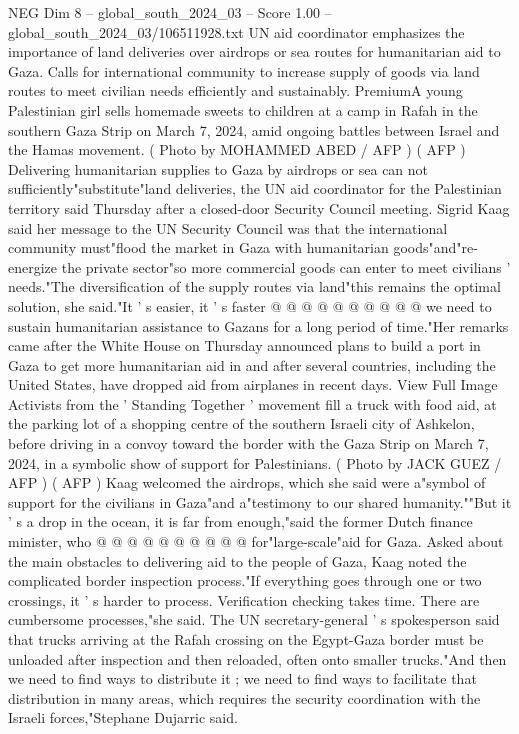 \begin{textsample}{NEG Dim 8 – global\_south\_2024\_03 – Score 1.00 – global\_south\_2024\_03/106511928.txt}  \label{ex:f8_neg_363}
UN aid coordinator emphasizes the importance of land deliveries over airdrops or sea routes for humanitarian aid to Gaza.
Calls for international community to increase supply of goods via land routes to meet civilian needs efficiently and sustainably.
PremiumA young Palestinian girl sells homemade sweets to children at a camp in Rafah in the southern Gaza Strip on March 7, 2024, amid ongoing battles between Israel and the Hamas movement. ( Photo by MOHAMMED ABED / AFP ) ( AFP ) Delivering humanitarian supplies to Gaza by airdrops or sea can not sufficiently"substitute"land deliveries, the UN aid coordinator for the Palestinian territory said Thursday after a closed-door Security Council meeting.
Sigrid Kaag said her message to the UN Security Council was that the international community must"flood the market in Gaza with humanitarian goods"and"re-energize the private sector"so more commercial goods can enter to meet civilians ' needs."The diversification of the supply routes via land"this remains the optimal solution, she said."It ' s easier, it ' s faster @ @ @ @ @ @ @ @ @ @ we need to sustain humanitarian assistance to Gazans for a long period of time."Her remarks came after the White House on Thursday announced plans to build a port in Gaza to get more humanitarian aid in and after several countries, including the United States, have dropped aid from airplanes in recent days.
View Full Image Activists from the ' Standing Together ' movement fill a truck with food aid, at the parking lot of a shopping centre of the southern Israeli city of Ashkelon, before driving in a convoy toward the border with the Gaza Strip on March 7, 2024, in a symbolic show of support for Palestinians. ( Photo by JACK GUEZ / AFP ) ( AFP ) Kaag welcomed the airdrops, which she said were a"symbol of support for the civilians in Gaza"and a"testimony to our shared humanity.""But it ' s a drop in the ocean, it is far from enough,"said the former Dutch finance minister, who @ @ @ @ @ @ @ @ @ @ for"large-scale"aid for Gaza.
Asked about the main obstacles to delivering aid to the people of Gaza, Kaag noted the complicated border inspection process."If everything goes through one or two crossings, it ' s harder to process.
Verification checking takes time.
There are cumbersome processes,"she said.
The UN secretary-general ' s spokesperson said that trucks arriving at the Rafah crossing on the Egypt-Gaza border must be unloaded after inspection and then reloaded, often onto smaller trucks."And then we need to find ways to distribute it ; we need to find ways to facilitate that distribution in many areas, which requires the security coordination with the Israeli forces,"Stephane Dujarric said.

\end{textsample}
